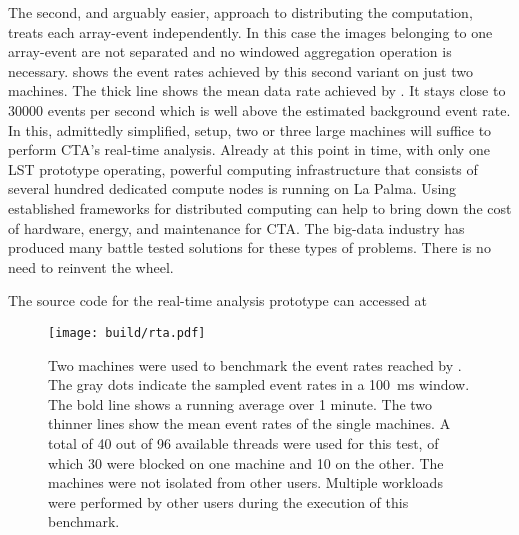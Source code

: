 The second, and arguably easier,  approach to distributing the computation, treats each array-event independently. 
In this case the images belonging to one array-event are not separated and no windowed aggregation operation is necessary.
 shows the event rates achieved by this second variant on just two machines. 
The thick line shows the mean data rate achieved by \jayct. It stays close to \num{30000} events per second which is well above the estimated 
background event rate. 
In this, admittedly simplified, setup, two or three large machines will suffice to perform CTA's real-time analysis. 
Already at this point in time, with only one LST prototype operating, powerful computing infrastructure that consists of several hundred 
dedicated compute nodes is running on La Palma. 
Using established frameworks for distributed computing can help to bring down the cost of hardware, energy, and maintenance for CTA.
The big-data industry has produced many battle tested solutions for these types of problems. There is no need to reinvent the wheel.

The source code for the \jayct real-time analysis prototype can accessed at


\begin{figure}[h]
    \centering
    \texttt{[image: build/rta.pdf]}
    \caption[Real-time analysis event rates]{Two machines were used to benchmark the event rates reached by \jayct.
     The gray dots indicate the sampled event rates in a \SI{100}{\milli\second} window. The bold line shows a running average over 1 minute.
     The two thinner lines show the mean event rates of the single machines. 
     A total of 40 out of 96 available threads were used for this test, of which 30 were blocked on one machine and 10 on the other.
     The machines were not isolated from other users. 
     Multiple workloads were performed by other users during the execution of this benchmark. }
    \label{fig:rta}
  \end{figure}
  

